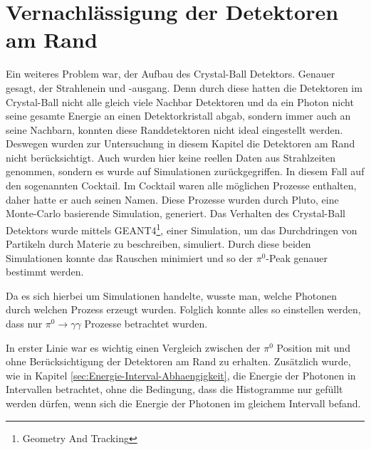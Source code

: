 \documentclass[a4paper,11pt,oneside,final,german,openbib,pdftex]{scrbook}
\begin{document}
\section{Vernachl\"assigung der Detektoren am Rand}

Ein weiteres Problem war, der Aufbau des Crystal-Ball Detektors. Genauer gesagt, der Strahlenein und -ausgang. Denn durch diese hatten die Detektoren im Crystal-Ball nicht alle gleich viele Nachbar Detektoren und da ein Photon nicht seine gesamte Energie an einen Detektorkristall abgab, sondern immer auch an seine Nachbarn, konnten diese Randdetektoren nicht ideal eingestellt werden. Deswegen wurden zur Untersuchung in diesem Kapitel die Detektoren am Rand nicht ber\"ucksichtigt. Auch wurden hier keine reellen Daten aus Strahlzeiten genommen, sondern es wurde auf Simulationen zur\"uckgegriffen. In diesem Fall auf den sogenannten Cocktail. Im Cocktail waren alle m\"oglichen Prozesse enthalten, daher hatte er auch seinen Namen. Diese Prozesse wurden durch Pluto, eine Monte-Carlo basierende Simulation, generiert. Das Verhalten des Crystal-Ball Detektors wurde mittels GEANT4\footnote{Geometry And Tracking}, einer Simulation, um das Durchdringen von Partikeln durch Materie zu beschreiben, simuliert. Durch diese beiden Simulationen konnte das Rauschen minimiert und so der $\pi^0$-Peak genauer bestimmt werden.

Da es sich hierbei um  Simulationen handelte, wusste man, welche Photonen durch welchen Prozess erzeugt wurden. Folglich konnte alles so einstellen werden, dass nur $\pi^0 \rightarrow \gamma \gamma$ Prozesse betrachtet wurden.

In erster Linie war es wichtig einen Vergleich zwischen der $\pi^0$ Position mit und ohne Ber\"ucksichtigung der Detektoren am Rand zu erhalten. Zus\"atzlich wurde, wie in Kapitel \ref{sec:Energie-Interval-Abhaengigkeit}, die Energie der Photonen in Intervallen betrachtet, ohne die Bedingung, dass die Histogramme nur gef\"ullt werden d\"urfen, wenn sich die Energie der Photonen im gleichem Intervall befand. 
\end{document}
